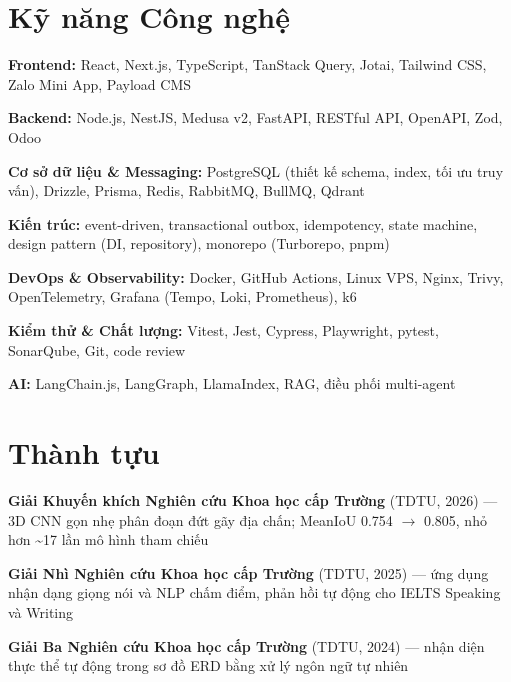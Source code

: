 \section{Kỹ năng Công nghệ}
\begin{onecolentry}
\begin{highlights}
    \item \textbf{Frontend:} React, Next.js, TypeScript, TanStack Query, Jotai, Tailwind CSS, Zalo Mini App, Payload CMS
    \item \textbf{Backend:} Node.js, NestJS, Medusa v2, FastAPI, RESTful API, OpenAPI, Zod, Odoo
    \item \textbf{Cơ sở dữ liệu \& Messaging:} PostgreSQL (thiết kế schema, index, tối ưu truy vấn), Drizzle, Prisma, Redis, RabbitMQ, BullMQ, Qdrant
    \item \textbf{Kiến trúc:} event-driven, transactional outbox, idempotency, state machine, design pattern (DI, repository), monorepo (Turborepo, pnpm)
    \item \textbf{DevOps \& Observability:} Docker, GitHub Actions, Linux VPS, Nginx, Trivy, OpenTelemetry, Grafana (Tempo, Loki, Prometheus), k6
    \item \textbf{Kiểm thử \& Chất lượng:} Vitest, Jest, Cypress, Playwright, pytest, SonarQube, Git, code review
    \item \textbf{AI:} LangChain.js, LangGraph, LlamaIndex, RAG, điều phối multi-agent
\end{highlights}
\end{onecolentry}

\section{Thành tựu}
\begin{onecolentry}
    \begin{highlights}
        \item \textbf{Giải Khuyến khích Nghiên cứu Khoa học cấp Trường} (TDTU, 2026) --- 3D CNN gọn nhẹ phân đoạn đứt gãy địa chấn; MeanIoU 0.754 $\rightarrow$ 0.805, nhỏ hơn \textasciitilde17 lần mô hình tham chiếu
        \item \textbf{Giải Nhì Nghiên cứu Khoa học cấp Trường} (TDTU, 2025) --- ứng dụng nhận dạng giọng nói và NLP chấm điểm, phản hồi tự động cho IELTS Speaking và Writing
        \item \textbf{Giải Ba Nghiên cứu Khoa học cấp Trường} (TDTU, 2024) --- nhận diện thực thể tự động trong sơ đồ ERD bằng xử lý ngôn ngữ tự nhiên
    \end{highlights}
\end{onecolentry}
